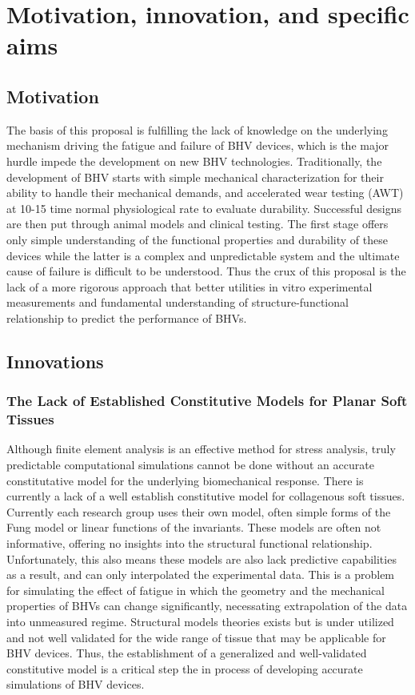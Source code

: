\section{Motivation, innovation, and specific aims}

\subsection{Motivation}
    The basis of this proposal is fulfilling the lack of knowledge on the underlying mechanism driving the fatigue and failure of BHV devices, which is the major hurdle impede the development on new BHV technologies. Traditionally, the development of BHV starts with simple mechanical characterization for their ability to handle their mechanical demands, and accelerated wear testing (AWT) at 10-15 time normal physiological rate to evaluate durability. Successful designs are then put through animal models and clinical testing. The first stage offers only simple understanding of the functional properties and durability of these devices while the latter is a complex and unpredictable system and the ultimate cause of failure is difficult to be understood. Thus the crux of this proposal is the lack of a more rigorous approach that better utilities in vitro experimental measurements and fundamental understanding of structure-functional relationship to predict the performance of BHVs.

\subsection{Innovations}
\subsubsection{The Lack of Established Constitutive Models for Planar Soft Tissues}
    Although finite element analysis is an effective method for stress analysis, truly predictable computational simulations cannot be done without an accurate constitutative model for the underlying biomechanical response. There is currently a lack of a well establish constitutive model for collagenous soft tissues. Currently each research group uses their own model, often simple forms of the Fung model or linear functions of the invariants. These models are often not informative, offering no insights into the structural functional relationship. Unfortunately, this also means these models are also lack predictive capabilities as a result, and can only interpolated the experimental data. This is a problem for simulating the effect of fatigue in which the geometry and the mechanical properties of BHVs can change significantly, necessating extrapolation of the data into unmeasured regime. Structural models theories exists \cite{sacks_incorporation_2003,lanir_structural_1979,driessen_structural_2005} but is under utilized and not well validated for the wide range of tissue that may be applicable for BHV devices. Thus, the establishment of a generalized and well-validated constitutive model is a critical step the in process of developing accurate simulations of BHV devices.

